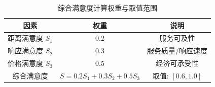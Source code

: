 \begin{table}[h]
\centering
\caption{综合满意度计算权重与取值范围}
\begin{tabular}{|c|c|c|}
\hline
因素 & 权重 & 说明 \\
\hline
距离满意度 $S_1$ & 0.2 & 服务可及性 \\
响应满意度 $S_2$ & 0.3 & 服务质量/响应速度 \\
价格满意度 $S_3$ & 0.5 & 经济可承受性 \\
\hline
综合满意度 & $S = 0.2S_1 + 0.3S_2 + 0.5S_3$ & 取值: $[0.6, 1.0]$ \\
\hline
\end{tabular}
\end{table}